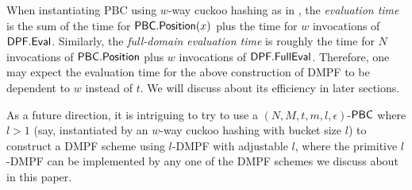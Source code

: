 When instantiating PBC using $w$-way cuckoo hashing as in , the \emph{evaluation time} is the sum of the time for ${\sf PBC}.{\sf Position}(x)$ plus the time for $w$ invocations of ${\sf DPF}.{\sf Eval}$. Similarly, the \emph{full-domain evaluation time} is roughly the time for $N$ invocations of ${\sf PBC}.{\sf Position}$ plus $w$ invocations of ${\sf DPF}.{\sf FullEval}$. Therefore, one may expect the evaluation time for the above construction of DMPF to be dependent to $w$ instead of $t$. We will discuss about its efficiency in later sections. 
\begin{remark}
  As a future direction, it is intriguing to try to use a $(N,M,t,m,l,\epsilon)$-${\sf PBC}$ where $l>1$ (say, instantiated by an $w$-way cuckoo hashing with bucket size $l$) to construct a DMPF scheme using $l$-DMPF with adjustable $l$, where the primitive $l$-DMPF can be implemented by any one of the DMPF schemes we discuss about in this paper. 
\end{remark}